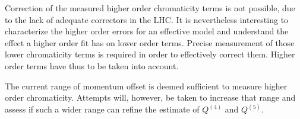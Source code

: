 Correction of the measured higher order chromaticity terms is not possible, due to the lack of adequate
correctors in the LHC. It is nevertheless interesting to characterize the higher order errors for an effective model and understand the effect a higher order fit has on lower order terms.
Precise measurement of those lower chromaticity terms is required in order to effectively correct them. 
Higher order terms have thus to be taken into account.

The current range of momentum offset is deemed sufficient to measure higher order chromaticity. Attempts will, however,
be taken to increase that range and assess if such a wider range can refine the estimate of $Q^{(4)}$ and
$Q^{(5)}$.
